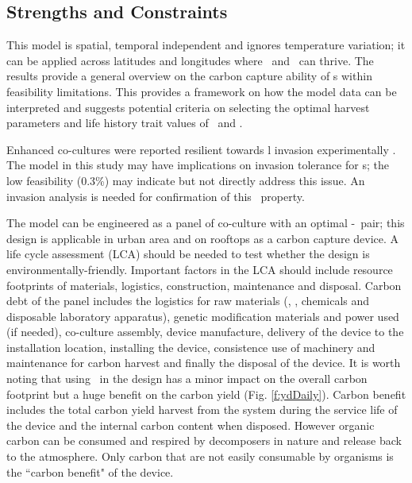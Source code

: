 \documentclass[../thesis.tex]{subfiles} %
\begin{document}
\subsection{Strengths and Constraints}
This model is spatial, temporal independent and ignores temperature variation; it can be applied across latitudes and longitudes where \phy\ and \bac\ can thrive.  The results provide a general overview on the carbon capture ability of \pbs s within feasibility limitations.  This provides a framework on how the model data can be interpreted and suggests potential criteria on selecting the optimal harvest parameters and life history trait values of \phy\ and \bac.

Enhanced co-cultures were reported resilient towards \bac l invasion experimentally \autocite{fuentes2016impact,seyedsayamdost2011roseobacticides}.  The model in this study may have implications on invasion tolerance for \pbs s; the low feasibility (0.3\%) may indicate but not directly address this issue.  An invasion analysis is needed for confirmation of this \pbs\ property.

The model can be engineered as a panel of co-culture with an optimal \phy-\bacm\ pair; this design is applicable in urban area and on rooftops as a carbon capture device.  A life cycle assessment (LCA) should be needed to test whether the design is environmentally-friendly.  Important factors in the LCA should include resource footprints of materials, logistics, construction, maintenance and disposal.  Carbon debt of the panel includes the logistics for raw materials (\phy, \bac, chemicals and disposable laboratory apparatus), genetic modification materials and power used (if needed), co-culture assembly, device manufacture, delivery of the device to the installation location, installing the device, consistence use of machinery and maintenance for carbon harvest and finally the disposal of the device.  It is worth noting that using \bac\ in the design has a minor impact on the overall carbon footprint but a huge benefit on the carbon yield (Fig. \ref{f:ydDaily}).  Carbon benefit includes the total carbon yield harvest from the system during the service life of the device and the internal carbon content when disposed.  However organic carbon can be consumed and respired by decomposers in nature and release back to the atmosphere.  Only carbon that are not easily consumable by organisms is the ``carbon benefit" of the device.
\end{document}

